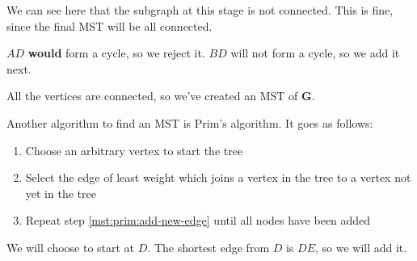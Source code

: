 \documentclass[../main.tex]{subfile}
\begin{document}
We can see here that the subgraph at this stage is not connected. This is fine, since the final MST will be all connected.

$AD$ \textbf{would} form a cycle, so we reject it. $BD$ will not form a cycle, so we add it next.

\begin{center}
\end{center}

All the vertices are connected, so we've created an MST of $\mathbf{G}$.


Another algorithm to find an MST is Prim's algorithm. It goes as follows:

\begin{enumerate}
	\item Choose an arbitrary vertex to start the tree
	\item\label{mst:prim:add-new-edge} Select the edge of least weight which joins a vertex in the tree to a vertex not yet in the tree
	\item Repeat step \ref{mst:prim:add-new-edge} until all nodes have been added
\end{enumerate}

We will choose to start at $D$. The shortest edge from $D$ is $DE$, so we will add it.

\begin{center}
\end{center}
\end{document}
